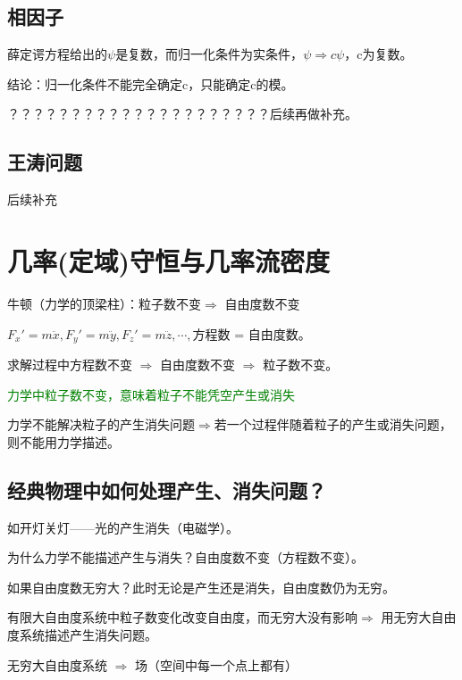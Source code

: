 \subsection{相因子}
薛定谔方程给出的$\psi$是复数，而归一化条件为实条件，$\psi \Rightarrow c\psi$，c为复数。

结论：归一化条件不能完全确定c，只能确定c的模。
 
？？？？？？？？？？？？？？？？？？？？？后续再做补充。



\subsection{王涛问题}

后续补充













\section{几率(定域)守恒与几率流密度}

牛顿（力学的顶梁柱）：粒子数不变$\Rightarrow$ 自由度数不变

$F_x' = m\ddot{x},F_y' = m\ddot{y},F_z' = m\ddot{z},\cdots,$方程数 = 自由度数。

求解过程中方程数不变 $\Rightarrow$ 自由度数不变 $\Rightarrow$ 粒子数不变。

\textcolor{green}{力学中粒子数不变，意味着粒子不能凭空产生或消失}

力学不能解决粒子的产生消失问题$\Rightarrow$若一个过程伴随着粒子的产生或消失问题，则不能用力学描述。

\subsection{经典物理中如何处理产生、消失问题？}

如开灯关灯——光的产生消失（电磁学）。

为什么力学不能描述产生与消失？自由度数不变（方程数不变）。

如果自由度数无穷大？此时无论是产生还是消失，自由度数仍为无穷。

有限大自由度系统中粒子数变化改变自由度，而无穷大没有影响$\Rightarrow$ 用无穷大自由度系统描述产生消失问题。

无穷大自由度系统 $\Rightarrow$ 场（空间中每一个点上都有）

